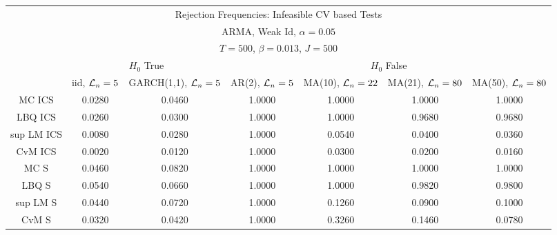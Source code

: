  \begin{table}[H] 
 \tiny 
 \centering 
\begin{tabular}{|c|c|c||c|c|c|c|} 
\multicolumn{7}{c}{ Rejection Frequencies: Infeasible CV based Tests } \\ 
\multicolumn{7}{c}{ ARMA, Weak Id, $\alpha = 0.05$ } \\ 
\multicolumn{7}{c}{ $T=500$, $\beta = 0.013$, $J=500$ } \\ 
  \multicolumn{1}{c}{ } & \multicolumn{2}{c}{ $H_{0}$ True} & \multicolumn{4}{c}{ $H_{0}$ False} \\ 
 \hline 
 & iid, $\mathcal{L}_n=5$ & GARCH(1,1), $\mathcal{L}_n=5$ & AR(2), $\mathcal{L}_n=5$ & MA(10), $\mathcal{L}_n=22$ & MA(21), $\mathcal{L}_n=80$ & MA(50), $\mathcal{L}_n=80$   \\ 
 \hline 
 MC ICS &  0.0280 &  0.0460 &  1.0000 &  1.0000 &  1.0000 &  1.0000 \\ 
 LBQ ICS &  0.0260 &  0.0300 &  1.0000 &  1.0000 &  0.9680 &  0.9680 \\ 
 sup LM ICS &  0.0080 &  0.0280 &  1.0000 &  0.0540 &  0.0400 &  0.0360 \\ 
 CvM ICS &  0.0020 &  0.0120 &  1.0000 &  0.0300 &  0.0200 &  0.0160 \\ 
 \hline 
 MC S &  0.0460 &  0.0820 &  1.0000 &  1.0000 &  1.0000 &  1.0000 \\ 
 LBQ S &  0.0540 &  0.0660 &  1.0000 &  1.0000 &  0.9820 &  0.9800 \\ 
 sup LM S &  0.0440 &  0.0720 &  1.0000 &  0.1260 &  0.0900 &  0.1000 \\ 
 CvM S &  0.0320 &  0.0420 &  1.0000 &  0.3260 &  0.1460 &  0.0780 \\ 
 \hline 
\end{tabular}
 \end{table}

